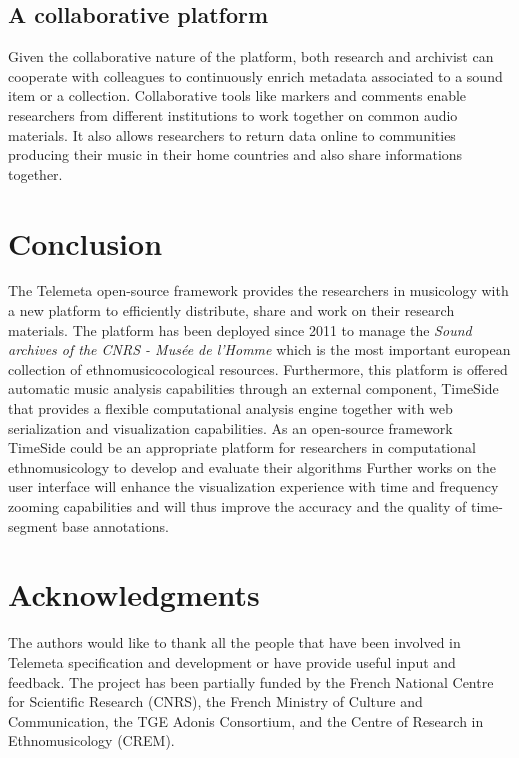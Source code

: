 \documentclass{sig-alternate}
\begin{document}
\subsection{A collaborative platform}
Given the collaborative nature of the platform, both research and archivist can cooperate with colleagues to continuously enrich metadata associated to a sound item or a collection.  
Collaborative tools like markers and comments enable researchers from different institutions to work together on common audio materials.
It also allows researchers to return data online to communities producing their music in their home countries and also share informations together.
\section{Conclusion}
The Telemeta open-source framework provides the researchers in musicology with a new platform to efficiently distribute, share and work on their research materials.
The platform has been deployed since 2011 to manage the \emph{Sound archives of the CNRS - Musée de l'Homme} which is the most important european collection of ethnomusicocological resources.
Furthermore, this platform is offered automatic music analysis capabilities through an external component, TimeSide that provides a flexible computational analysis engine together with web serialization and visualization capabilities. As an open-source framework TimeSide could be an appropriate platform for researchers in computational ethnomusicology to develop and evaluate their algorithms
Further works on the user interface will enhance the visualization experience with time and frequency zooming capabilities and will thus improve the accuracy and the quality of time-segment base annotations.
\section*{Acknowledgments} 
{\small The authors would like to thank all the people that have been involved in Telemeta specification and development or have provide useful input and feedback. 
The project has been partially funded by the French National Centre for Scientific Research (CNRS), the French Ministry of Culture and Communication, the TGE Adonis Consortium, and the Centre of Research in Ethnomusicology (CREM).}
%


\end{document}
